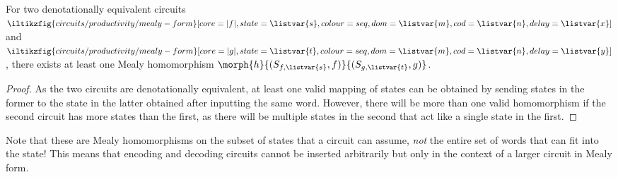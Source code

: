 \begin{proposition}
    For two denotationally equivalent circuits \(
    \iltikzfig{circuits/productivity/mealy-form}[core=|f|,state=\listvar{s},colour=seq,dom=\listvar{m},cod=\listvar{n},delay=\listvar{x}]
    \) and \(
    \iltikzfig{circuits/productivity/mealy-form}[core=|g|,state=\listvar{t},colour=seq,dom=\listvar{m},cod=\listvar{n},delay=\listvar{y}]
    \), there exists at least one Mealy homomorphism \(
    \morph{h}{(S_{f,\listvar{s}},f)}{(S_{g,\listvar{t}},g)}
    \).
\end{proposition}
\begin{proof}
    As the two circuits are denotationally equivalent, at least one valid
    mapping of states can be obtained by sending states in the former to the
    state in the latter obtained after inputting the same word.
    However, there will be more than one valid homomorphism if the second
    circuit has more states than the first, as there will be multiple states in
    the second that act like a single state in the first.
\end{proof}

Note that these are Mealy homomorphisms on the subset of states that a circuit
can assume, \emph{not} the entire set of words that can fit into the state!
This means that encoding and decoding circuits cannot be inserted arbitrarily
but only in the context of a larger circuit in Mealy form.

